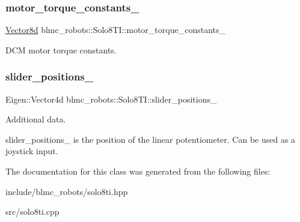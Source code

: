 \subsubsection{\texorpdfstring{motor\+\_\+torque\+\_\+constants\+\_\+}{motor\_torque\_constants\_}}
{\footnotesize\ttfamily \hyperlink{common__header_8hpp_a98975ffbe0bca1296078e0350dfedd60}{Vector8d} blmc\+\_\+robots\+::\+Solo8\+T\+I\+::motor\+\_\+torque\+\_\+constants\+\_\+\hspace{0.3cm}{\ttfamily [private]}}



D\+CM motor torque constants. 

\mbox{\label{classblmc__robots_1_1Solo8TI_ac81e772bd951a26989c1b9108eccecec}} 
\subsubsection{\texorpdfstring{slider\+\_\+positions\+\_\+}{slider\_positions\_}}
{\footnotesize\ttfamily Eigen\+::\+Vector4d blmc\+\_\+robots\+::\+Solo8\+T\+I\+::slider\+\_\+positions\+\_\+\hspace{0.3cm}{\ttfamily [private]}}



Additional data. 

slider\+\_\+positions\+\_\+ is the position of the linear potentiometer. Can be used as a joystick input. 

The documentation for this class was generated from the following files\+:\begin{DoxyCompactItemize}
\item 
include/blmc\+\_\+robots/solo8ti.\+hpp\item 
src/solo8ti.\+cpp\end{DoxyCompactItemize}
